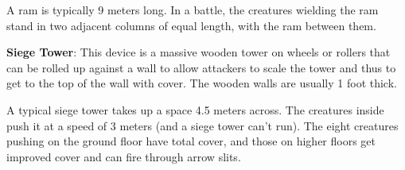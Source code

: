 A ram is typically 9 meters long. In a battle, the creatures wielding the ram stand in two adjacent columns of equal length, with the ram between them.

\textbf{Siege Tower}: This device is a massive wooden tower on wheels or rollers that can be rolled up against a wall to allow attackers to scale the tower and thus to get to the top of the wall with cover. The wooden walls are usually 1 foot thick.

A typical siege tower takes up a space 4.5 meters across. The creatures inside push it at a speed of 3 meters (and a siege tower can't run). The eight creatures pushing on the ground floor have total cover, and those on higher floors get improved cover and can fire through arrow slits.

